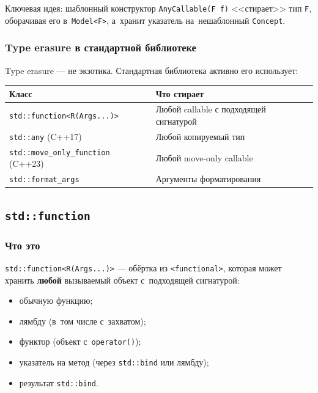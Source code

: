 \documentclass[a4paper,12pt]{article}
\begin{document}
Ключевая идея: шаблонный конструктор \texttt{AnyCallable(F f)} <<стирает>> тип
\texttt{F}, оборачивая его в~\texttt{Model<F>}, а~хранит указатель на~нешаблонный
\texttt{Concept}.

\subsubsection{Type erasure в стандартной библиотеке}

Type erasure --- не экзотика. Стандартная библиотека активно его использует:

\begin{center}
\begin{tabular}{l l}
\toprule
\textbf{Класс} & \textbf{Что стирает} \\
\midrule
\texttt{std::function<R(Args...)>} & Любой callable с подходящей сигнатурой \\
\texttt{std::any} (C++17)          & Любой копируемый тип \\
\texttt{std::move\_only\_function} (C++23) & Любой move-only callable \\
\texttt{std::format\_args}         & Аргументы форматирования \\
\bottomrule
\end{tabular}
\end{center}

\subsection{\texttt{std::function}}

\subsubsection{Что это}

\texttt{std::function<R(Args...)>} --- обёртка из \texttt{<functional>},
которая может хранить \textbf{любой} вызываемый объект с~подходящей сигнатурой:

\begin{itemize}
    \item обычную функцию;
    \item лямбду (в~том числе с~захватом);
    \item функтор (объект с~\texttt{operator()});
    \item указатель на метод (через \texttt{std::bind} или лямбду);
    \item результат \texttt{std::bind}.
\end{itemize}
\end{document}
